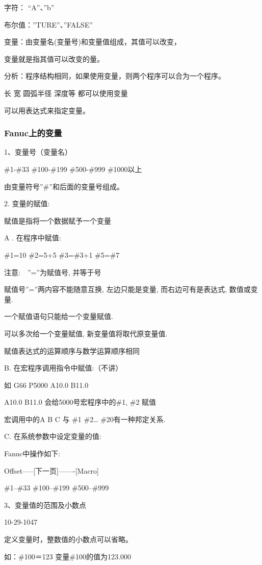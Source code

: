 	字符： “A”、”b”
	
	布尔值：”TURE”、”FALSE”
	
	变量：由变量名(变量号)和变量值组成，其值可以改变，
	
	变量就是指其值可以改变的量。
	
	分析：程序结构相同，如果使用变量，则两个程序可以合为一个程序。
	
	长 宽 圆弧半径 深度等 都可以使用变量

	可以用表达式来指定变量。
	
\subsubsection{Fanuc上的变量}

	1、变量号（变量名）

	$\#$1-\#33   \#100-\#199  \#500-\#999  \#1000以上

	由变量符号”\#”和后面的变量号组成。

	2. 变量的赋值:

	赋值是指将一个数据赋予一个变量

	A . 在程序中赋值:

	\#1=10      \#2=5+5       \#3=\#3+1  \#5=\#7

	注意:　”=”为赋值号, 并等于号

	赋值号”=”两内容不能随意互换, 左边只能是变量, 而右边可有是表达式, 数值或变量.

	一个赋值语句只能给一个变量赋值.

	可以多次给一个变量赋值, 新变量值将取代原变量值. 

	赋值表达式的运算顺序与数学运算顺序相同

	B. 在宏程序调用指令中赋值:（不讲）

	如 G66 P5000 A10.0 B11.0

	A10.0 B11.0 会给5000号宏程序中的\#1, \#2 赋值

	宏调用中的A B C 与 \#1 \#2… \#20有一种邦定关系.

	C. 在系统参数中设定变量的值:

	Fanuc中操作如下: 

	Offset-----[下一页]-------[Macro]

	\#1--\#33   \#100--\#199   \#500--\#999

	3、变量值的范围及小数点

	10-29-1047

	定义变量时，整数值的小数点可以省略。

	如：\#100＝123   变量\#100的值为123.000

